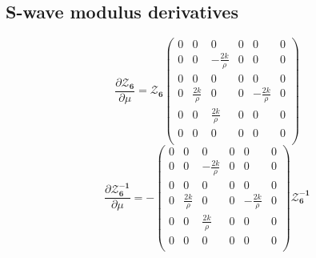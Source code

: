 \documentclass[a4paper,10pt]{article}
\begin{document}
\subsection{S-wave modulus derivatives}
\begin{equation}
\frac{\partial \boldsymbol{\mathcal{Z}_6}}{\partial \mu} = \boldsymbol{\mathcal{Z}_6}\left(
\begin{array}{cccccc}
 0 & 0 & 0 & 0 & 0 & 0 \\
 0 & 0 & -\frac{2 k}{\rho } & 0 & 0 & 0 \\
 0 & 0 & 0 & 0 & 0 & 0 \\
 0 & \frac{2 k}{\rho } & 0 & 0 & -\frac{2 k}{\rho } & 0 \\
 0 & 0 & \frac{2 k}{\rho } & 0 & 0 & 0 \\
 0 & 0 & 0 & 0 & 0 & 0 \\
\end{array}
\right)
\end{equation}
\begin{equation}
\frac{\partial \boldsymbol{\mathcal{Z}_6^{-1}}}{\partial \mu} = -\left(
\begin{array}{cccccc}
 0 & 0 & 0 & 0 & 0 & 0 \\
 0 & 0 & -\frac{2 k}{\rho } & 0 & 0 & 0 \\
 0 & 0 & 0 & 0 & 0 & 0 \\
 0 & \frac{2 k}{\rho } & 0 & 0 & -\frac{2 k}{\rho } & 0 \\
 0 & 0 & \frac{2 k}{\rho } & 0 & 0 & 0 \\
 0 & 0 & 0 & 0 & 0 & 0 \\
\end{array}
\right)\boldsymbol{\mathcal{Z}_6^{-1}}
\end{equation}
\end{document}
